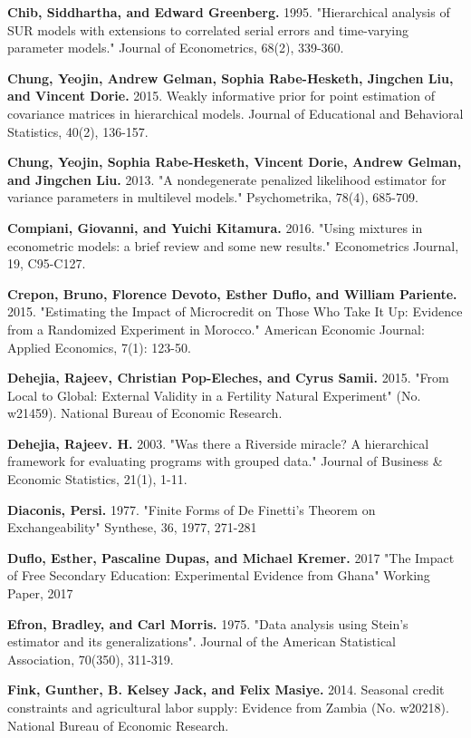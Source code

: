 \documentclass[AER]{AEA}
\begin{document}
\begin{thebibliography}{99}
 \textbf{ Chib, Siddhartha, and Edward Greenberg.} 1995. "Hierarchical analysis of SUR models with extensions to correlated serial errors and time-varying parameter models." Journal of Econometrics, 68(2), 339-360.

 \textbf{ Chung, Yeojin, Andrew Gelman, Sophia Rabe-Hesketh, Jingchen Liu, and Vincent Dorie.} 2015. Weakly informative prior for point estimation of covariance matrices in hierarchical models. Journal of Educational and Behavioral Statistics, 40(2), 136-157.

 \textbf{ Chung, Yeojin, Sophia Rabe-Hesketh, Vincent Dorie, Andrew Gelman, and Jingchen Liu.} 2013. "A nondegenerate penalized likelihood estimator for variance parameters in multilevel models." Psychometrika, 78(4), 685-709.

 \textbf{ Compiani, Giovanni, and Yuichi Kitamura.} 2016. "Using mixtures in econometric models: a brief review and some new results." Econometrics Journal, 19, C95-C127.

 \textbf{ Crepon, Bruno, Florence Devoto, Esther Duflo, and William Pariente.} 2015. "Estimating the Impact of Microcredit on Those Who Take It Up: Evidence from a Randomized Experiment in Morocco." American Economic Journal: Applied Economics, 7(1): 123-50.

 \textbf{ Dehejia, Rajeev, Christian Pop-Eleches, and Cyrus Samii.} 2015. "From Local to Global: External Validity in a Fertility Natural Experiment" (No. w21459). National Bureau of Economic Research.

 \textbf{ Dehejia, Rajeev. H.} 2003. "Was there a Riverside miracle? A hierarchical framework for evaluating programs with grouped data." Journal of Business \& Economic Statistics, 21(1), 1-11.

 \textbf{ Diaconis, Persi.} 1977. "Finite Forms of De Finetti's Theorem on Exchangeability" Synthese, 36, 1977,  271-281

 \textbf{ Duflo, Esther, Pascaline Dupas, and Michael Kremer.} 2017 "The Impact of Free Secondary Education: Experimental Evidence from Ghana" Working Paper, 2017

 \textbf{ Efron, Bradley, and Carl Morris.} 1975. "Data analysis using Stein's estimator and its generalizations". Journal of the American Statistical Association, 70(350), 311-319.

 \textbf{ Fink, Gunther, B. Kelsey Jack, and Felix Masiye.} 2014. Seasonal credit constraints and agricultural labor supply: Evidence from Zambia (No. w20218). National Bureau of Economic Research.


\end{thebibliography}
\end{document}
